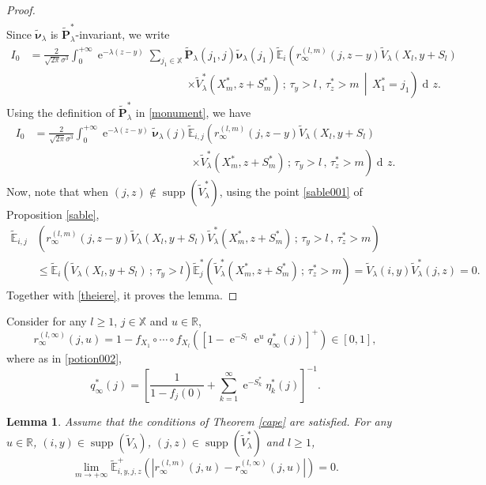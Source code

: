 \documentclass[12pt]{amsart}
\newtheorem{lemma}[theorem]{Lemma}
\theoremstyle{definition}
\numberwithin{equation}{section}
\newcommand*{\abs}[1]{\left\lvert#1\right\rvert}
\newcommand*{\sachant}[2]{\left.#1 \,\middle|\,#2\right.}
\def\bb#1{\mathbb{#1}}
\def\tt#1{\tilde{#1}}
\def\tbf#1{\tilde{\mathbf{#1}}}
\def\tbs#1{\tilde{\boldsymbol{#1}}}
\def\tbb#1{\tilde{\mathbb{#1}}}
\def\geq{\geqslant}
\def\leq{\leqslant}
\renewcommand\ll{\lambda}
\DeclareMathOperator{\dd}{d\!}
\DeclareMathOperator{\e}{e}
\DeclareMathOperator{\supp}{supp}
\begin{document}
\begin{proof}
\begin{align*}
\end{align*}
Since $\tbs \nu_{\ll}$ is $\tbf P_{\ll}^*$-invariant, we write
\begin{align*}
I_0 &= \frac{2}{\sqrt{2\pi} \sigma^3} \int_0^{+\infty} \e^{-\ll (z-y)} \sum_{j_1 \in \bb X} \tbf P_{\ll}(j_1,j) \tbs \nu_{\ll}(j_1) \tbb E_i \left( r_{\infty}^{(l,m)}(j,z-y)  \tt V_{\ll}\left( X_l,y+S_l \right) \right. \\
&\hspace{6cm} \left. \times \sachant{\tt V_{\ll}^* \left( X_m^*, z+S_m^* \right) \,;\, \tau_y > l \,,\, \tau_z^* > m}{X_1^*=j_1} \right)  \dd z.
\end{align*}
Using the definition of $\tbf P_{\ll}^*$ in \eqref{monument}, we have
\begin{align*}
I_0 &= \frac{2}{\sqrt{2\pi} \sigma^3} \int_0^{+\infty} \e^{-\ll (z-y)} \tbs \nu_{\ll}(j)  \tbb E_{i,j} \left( r_{\infty}^{(l,m)}(j,z-y)  \tt V_{\ll}\left( X_l,y+S_l \right) \right. \\
&\hspace{6cm} \left. \times \tt V_{\ll}^* \left( X_m^*, z+S_m^* \right) \,;\, \tau_y > l \,,\, \tau_z^* > m \right)  \dd z.
\end{align*}
Now, note that when $(j,z) \notin \supp\left( \tt V_{\ll}^* \right)$, using the point \ref{sable001} of Proposition \ref{sable},
\begin{align*}
\tbb E_{i,j} &\left( r_{\infty}^{(l,m)}(j,z-y)  \tt V_{\ll}\left( X_l,y+S_l \right) \tt V_{\ll}^* \left( X_m^*, z+S_m^* \right) \,;\, \tau_y > l \,,\, \tau_z^* > m \right) \\
&\leq \tbb E_i \left(  \tt V_{\ll}\left( X_l,y+S_l \right) \,;\, \tau_y > l \right) \tbb E_j^* \left( \tt V_{\ll}^* \left( X_m^*, z+S_m^* \right) \,;\, \tau_z^* > m \right) = \tt V_{\ll}(i,y) \tt V_{\ll}^*(j,z) = 0.
\end{align*}
Together with \eqref{theiere}, it proves the lemma.
\end{proof}

Consider for any $l \geq 1$, $j \in \bb X$ and $u \in \bb R$,
\begin{equation}
\label{mousse}
r_{\infty}^{(l,\infty)}(j,u) = 1-f_{X_1} \circ \cdots \circ f_{X_l} \left( \left[ 1- \e^{-S_l} \e^{u} q_{\infty}^*(j) \right]^+ \right) \in [0,1],
\end{equation}
where as in \eqref{potion002},
\[
q_{\infty}^*(j) = \left[ \frac{1}{1-f_j(0)} + \sum_{k=1}^{\infty} \e^{-S_k^*} \eta_k^*(j) \right]^{-1}.
\]

\begin{lemma} Assume that the conditions of Theorem \ref{cape} are satisfied.
\label{fontaine001}
For any $u \in \bb R$, $(i,y) \in \supp \left( \tt V_{\ll} \right)$, $(j,z) \in \supp \left( \tt V_{\ll}^* \right)$ and $l\geq 1$,
\[
\lim_{m\to +\infty} \tbb E_{i,y,j,z}^+ \left( \abs{r_{\infty}^{(l,m)}(j,u) - r_{\infty}^{(l,\infty)}(j,u)} \right) = 0.
\]
\end{lemma}
\end{document}
